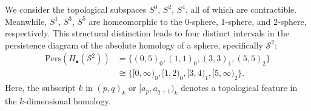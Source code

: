 \begin{example}{\cite[\S 2.3, Example]{de2011dualities}}
    We consider the topological subspaces $S^{0}$,
    $S^{2}$, $S^{4}$, all of which are contractible. Meanwhile,
    $S^{1}$, $S^{3}$, $S^{5}$ are homeomorphic to the $0$-sphere, $1$-sphere, and $2$-sphere,
    respectively. This structural distinction leads to four distinct intervals in
    the persistence diagram of the absolute homology of a sphere, specifically $\mathcal{S}^{2}$:
    \begin{align}
        \mathrm{Pers}(H_{\bullet}(\mathcal{S}^{2})) & = \{(0,5)_{0}, (1,1)_{0}, (3,3)_{1}, (5,5)_{2} \}             \nonumber\\
                                                    & \cong \{[0,\infty)_{0}, [1,2)_{0}, [3,4)_{1}, [5, \infty)_{2} \}.
    \end{align}
    Here, the subscript $k$ in $(p,q)_{k}$ or $[a_{p}, a_{q+1})_{k}$ denotes a topological
    feature in the $k$-dimensional homology.
\end{example}

